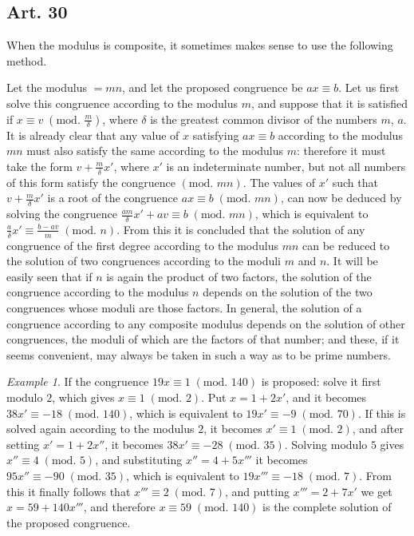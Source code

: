 \documentclass{book}
\theoremstyle{plain}
\theoremstyle{remark}
\newtheorem*{example}{Example}
\begin{document}
\subsection*{Art. 30} 

When the modulus is composite, it sometimes makes sense to use the following method. 


Let the modulus $=mn$, and let the proposed congruence be $ax \equiv b$.  Let us first solve this congruence according to the modulus $m$, and suppose that it is satisfied if $x \equiv v \;(\textrm{mod. }\frac{m}{\delta})$, where $\delta $ is the greatest common divisor of the numbers $m$, $a$.  It is already clear that any value of $x$ satisfying $ax \equiv b$ according to the modulus $mn$ must also satisfy the same according to the modulus $m$: therefore it must take the form $v + \frac{m}{\delta} x'$, where $x'$ is an indeterminate number, but not all numbers of this form satisfy the congruence $(\textrm{mod. } mn)$.    The values of  $x'$ such that $v + \frac{m}{\delta}x'$ is a root of the congruence $ax\equiv b \; (\textrm{mod. } mn)$, can now be deduced by solving the congruence $\frac{am}{\delta}x' + av \equiv b \; (\textrm{mod. } mn)$, which is equivalent to $\frac{a}{\delta} x' \equiv \frac{b-av}{m}\;(\textrm{mod. }n)$.  From this it is concluded that the solution of any congruence of the first degree according to the modulus $mn$ can be reduced to the solution of two congruences according to the moduli $m$ and $n$.  It will be easily seen that if $n$ is again the product of two factors, the solution of the congruence according to the modulus $n$ depends on the solution of the two congruences whose moduli are those factors.  In general, the solution of a congruence according to any composite modulus depends on the solution of other congruences, the moduli of which are the factors of that number; and these, if it seems convenient, may always be taken in such a way as to be prime numbers.

\begin{example} If the congruence $19x \equiv 1 \;(\textrm{mod. }140)$ is proposed: solve it first modulo $2$, which gives $x \equiv 1\; (\textrm{mod. }2)$.  Put $x = 1 + 2x'$, and it becomes $38x' \equiv -18\;(\textrm{mod. }140)$, which is equivalent to $19x' \equiv -9 \;(\textrm{mod. }70)$. If this is solved again according to the modulus $2$, it becomes $x' \equiv 1 \; (\textrm{mod. }2)$, and after setting $x' = 1 + 2x''$, it becomes $38x' \equiv -28\;(\textrm{mod. }35)$.  Solving modulo $5$ gives $x'' \equiv 4 \; (\textrm{mod. }5)$, and substituting $x'' = 4 + 5x'''$ it becomes $95x'' \equiv -90\;(\textrm{mod. }35)$, which is equivalent to $19x''' \equiv -18 \;(\textrm{mod. }7)$.  From this it finally follows that $x''' \equiv 2 \;(\textrm{mod. }7)$, and putting $x''' = 2 + 7x'$ we get $x = 59 + 140x'''$, and therefore $x \equiv 59 \;(\textrm{mod. }140)$ is the complete solution of the proposed congruence.\end{example}
\end{document}
